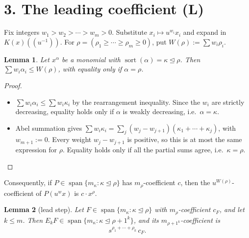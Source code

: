 \documentclass[11pt]{article}
\newtheorem{genericlemma}{Lemma}
\newenvironment{lem}[1]{\renewcommand{\thegenericlemma}{#1}\begin{genericlemma}}{\end{genericlemma}}
\theoremstyle{definition}
\newcommand{\domd}{\trianglelefteq}
\newcommand{\sort}{\operatorname{sort}}
\begin{document}
\section*{3. The leading coefficient (L)}

Fix integers $w_1 > w_2 > \cdots > w_m > 0$. Substitute $x_i \mapsto u^{w_i} x_i$ and expand in $K(x)((u^{-1}))$. For $\rho = (\rho_1 \ge \cdots \ge \rho_m \ge 0)$, put $W(\rho) := \sum w_i \rho_i$.

\begin{lem}{3.1}
Let $x^\alpha$ be a monomial with $\sort(\alpha) = \kappa \domd \rho$. Then $\sum w_i \alpha_i \le W(\rho)$, with equality only if $\alpha = \rho$.
\end{lem}

\begin{proof}
\leavevmode
\begin{itemize}
\item $\sum w_i \alpha_i \le \sum w_i \kappa_i$ by the rearrangement inequality. Since the $w_i$ are strictly decreasing, equality holds only if $\alpha$ is weakly decreasing, i.e.\ $\alpha = \kappa$.
\item Abel summation gives $\sum w_i \kappa_i = \sum_j (w_j - w_{j+1})(\kappa_1+\cdots+\kappa_j)$, with $w_{m+1} := 0$. Every weight $w_j - w_{j+1}$ is positive, so this is at most the same expression for $\rho$. Equality holds only if all the partial sums agree, i.e.\ $\kappa = \rho$. \qedhere
\end{itemize}
\end{proof}

\noindent Consequently, if $P \in \operatorname{span}\{m_\kappa : \kappa \domd \rho\}$ has $m_\rho$-coefficient $c$, then the $u^{W(\rho)}$-coefficient of $P(u^w x)$ is $c\cdot x^\rho$.

\begin{lem}{3.2}[lead step]
Let $F \in \operatorname{span}\{m_\kappa : \kappa \domd \rho\}$ with $m_\rho$-coefficient $c_F$, and let $k \le m$. Then $E_kF \in \operatorname{span}\{m_\kappa : \kappa \domd \rho + 1^k\}$, and its $m_{\rho+1^k}$-coefficient is
\[
s^{\rho_1+\cdots+\rho_k}\, c_F.
\]
\end{lem}
\end{document}
